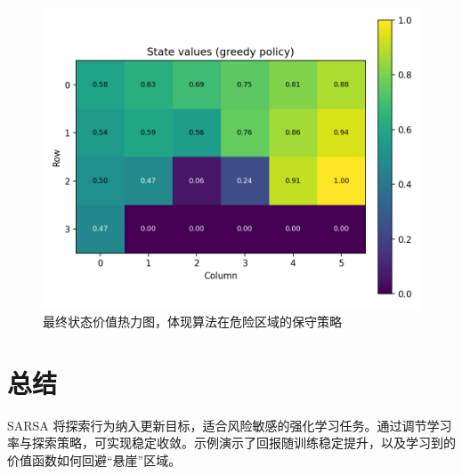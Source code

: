 \documentclass[UTF8,zihao=-4]{ctexart}
\begin{document}
\begin{figure}[H]
  \centering
  \includegraphics[width=0.82\linewidth]{sarsa_state_values.png}
  \caption{最终状态价值热力图，体现算法在危险区域的保守策略}
  \label{fig:sarsa_state_values_cn}
\end{figure}

\FloatBarrier
\section{总结}
SARSA 将探索行为纳入更新目标，适合风险敏感的强化学习任务。通过调节学习率与探索策略，可实现稳定收敛。示例演示了回报随训练稳定提升，以及学习到的价值函数如何回避“悬崖”区域。
\end{document}
